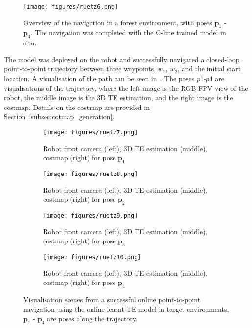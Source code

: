 \begin{figure}[h]
 \centering
 \texttt{[image: figures/ruetz6.png]}
 \caption[Overview of Robot Navigation of the Online Learned Model]{Overview of the navigation in a forest environment, with poses $\mathbf{p}_1$ - $\mathbf{p}_4$. The navigation was completed with the O-line trained model in situ.}
 \label{fig7:odap_nav_overview}
\end{figure}

The model was deployed on the robot and successfully navigated a closed-loop point-to-point trajectory between three waypoints, $w_1$, $w_2$, and the initial start location. A visualisation of the path can be seen in~. The poses $p1$-$p4$ are visualisations of the trajectory, where the left image is the RGB FPV view of the robot, the middle image is the 3D TE estimation, and the right image is the costmap. Details on the costmap are provided in Section~\ref{subsec:cotmap_generation}.

\begin{figure*}[ht!]
 \centering
 \begin{subfigure}{0.95\linewidth}
 \centering
 \texttt{[image: figures/ruetz7.png]}
 \caption{Robot front camera (left), 3D TE estimation (middle), costmap (right) for pose $\mathbf{p}_1$}
 \label{fig7:online_p1}
 \end{subfigure}
 \hfill
 \begin{subfigure}{0.95\linewidth}
 \centering
 \texttt{[image: figures/ruetz8.png]}
 \caption{Robot front camera (left), 3D TE estimation (middle), costmap (right) for pose $\mathbf{p}_2$}
 \label{fig7:online_p2}
 \end{subfigure}
 \begin{subfigure}{0.95\linewidth}
 \centering
 \texttt{[image: figures/ruetz9.png]}
 \caption{Robot front camera (left), 3D TE estimation (middle), costmap (right) for pose $\mathbf{p}_3$}
 \label{fig7:online_p3}
 \end{subfigure}
 \begin{subfigure}{0.95\linewidth}
 \centering
 \texttt{[image: figures/ruetz10.png]}
 \caption{Robot front camera (left), 3D TE estimation (middle), costmap (right) for pose $\mathbf{p}_4$}
 \label{fig7:online_p4}
 \end{subfigure}
 \caption[Scenes from Autonomous Robot Navigation using Online TE Approach]{Visualisation scenes from a successful online point-to-point navigation using the online learnt TE model in target environments, $\mathbf{p}_1$ - $\mathbf{p}_4$ are poses along the trajectory.}
 \label{fig7:odap_online_nav}
\end{figure*}

